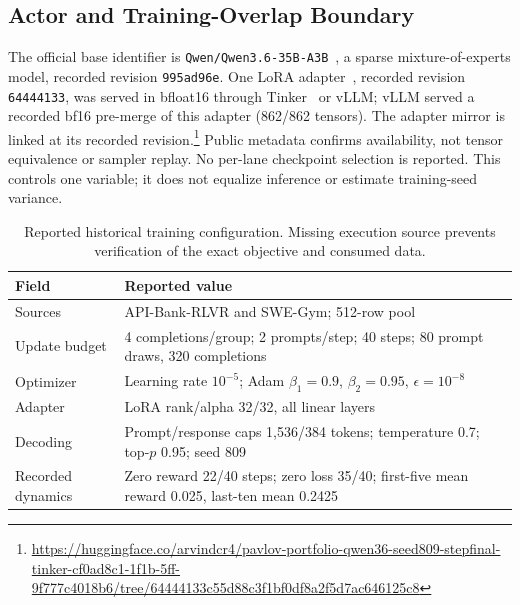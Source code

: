 \documentclass[a4paper,runningheads]{llncs}
\begin{document}
\subsection{Actor and Training-Overlap Boundary}
\label{sec:actor}
The official base identifier is \texttt{Qwen/Qwen3.6-35B-A3B}~\cite{qwen2026model}, a sparse
mixture-of-experts model, recorded revision \texttt{995ad96e}. One LoRA
adapter~\cite{hu2022lora}, recorded revision \texttt{64444133}, was served in
bfloat16 through Tinker~\cite{thinkingmachines2025tinker} or vLLM; vLLM served a
recorded bf16 pre-merge of this adapter (862/862 tensors). The adapter mirror is linked at its recorded revision.\footnote{\url{https://huggingface.co/arvindcr4/pavlov-portfolio-qwen36-seed809-stepfinal-tinker-cf0ad8c1-1f1b-5ff-9f777c4018b6/tree/64444133c55d88c3f1bf0df8a2f5d7ac646125c8}}
Public metadata confirms availability, not tensor equivalence or sampler replay. No per-lane checkpoint selection is reported. This controls one
variable; it does not equalize inference or estimate training-seed variance.

\begin{table}[t]
\caption{Reported historical training configuration. Missing execution source
prevents verification of the exact objective and consumed data.}
\label{tab:training}\centering\small\setlength{\tabcolsep}{3pt}
\begin{tabularx}{\textwidth}{@{}p{}Y@{}}\toprule
Field & Reported value \\\midrule
Sources & API-Bank-RLVR and SWE-Gym; 512-row pool \\
Update budget & 4 completions/group; 2 prompts/step; 40 steps; 80 prompt draws, 320 completions \\
Optimizer & Learning rate $10^{-5}$; Adam $\beta_1=0.9$, $\beta_2=0.95$, $\epsilon=10^{-8}$ \\
Adapter & LoRA rank/alpha 32/32, all linear layers \\
Decoding & Prompt/response caps 1,536/384 tokens; temperature 0.7; top-$p$ 0.95; seed 809 \\
Recorded dynamics & Zero reward 22/40 steps; zero loss 35/40; first-five mean reward 0.025, last-ten mean 0.2425 \\\bottomrule
\end{tabularx}
\end{table}
\end{document}
